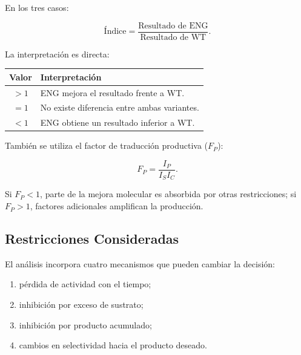En los tres casos:

\begin{equation}
\text{Índice}
=
\frac{\text{Resultado de ENG}}
{\text{Resultado de WT}}.
\end{equation}

La interpretación es directa:

\begin{table}[H]
\centering
{}



\renewcommand{\arraystretch}{1.25}

\begin{tabular}{|c|p{9.5cm}|}
\hline
Valor & Interpretación \\ \hline
\(>1\) & ENG mejora el resultado frente a WT. \\ \hline
\(=1\) & No existe diferencia entre ambas variantes. \\ \hline
\(<1\) & ENG obtiene un resultado inferior a WT. \\ \hline
\end{tabular}
\end{table}

También se utiliza el factor de traducción productiva (\(F_P\)):

\begin{equation}
F_P=
\frac{I_P}{I_S I_C}.
\end{equation}

Si \(F_P<1\), parte de la mejora molecular es absorbida por otras restricciones;
si \(F_P>1\), factores adicionales amplifican la producción.

\subsection{Restricciones Consideradas}
\label{subsec:restricciones_metodologia}

El análisis incorpora cuatro mecanismos que pueden cambiar la decisión:

\begin{enumerate}
    \item pérdida de actividad con el tiempo;
    \item inhibición por exceso de sustrato;
    \item inhibición por producto acumulado;
    \item cambios en selectividad hacia el producto deseado.
\end{enumerate}

